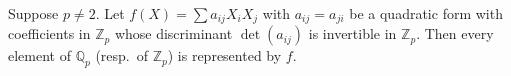 Suppose $p \neq 2$. Let $f(X) = \sum a_{ij} X_i X_j$ with $a_{ij} = a_{ji}$ be a quadratic form with coefficients in $\mathbb{Z}_p$ whose discriminant $\det(a_{ij})$ is invertible in $\mathbb{Z}_p$. Then every element of $\mathbb{Q}_p$ (resp.\ of $\mathbb{Z}_p$) is represented by $f$.
